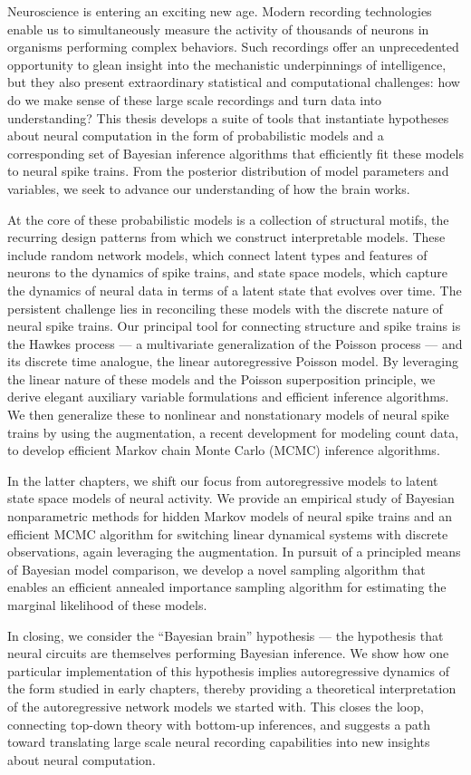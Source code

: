 Neuroscience is entering an exciting new age.  Modern recording
technologies enable us to simultaneously measure the activity of
thousands of neurons in organisms performing complex behaviors.  Such
recordings offer an unprecedented opportunity to glean insight into
the mechanistic underpinnings of intelligence, but they also present
extraordinary statistical and computational challenges: how do we make
sense of these large scale recordings and turn data into
understanding? This thesis develops a suite of tools that instantiate
hypotheses about neural computation in the form of
probabilistic models and a corresponding set of Bayesian inference
algorithms that efficiently fit these models to neural spike trains.
From the posterior distribution of model parameters and variables,
we seek to advance our understanding of how the brain works. 

At the core of these probabilistic models is a collection of
structural motifs, the recurring design patterns from which we
construct interpretable models. These include random network models,
which connect latent types and features of neurons to the dynamics of
spike trains, and state space models, which capture the dynamics of
neural data in terms of a latent state that evolves over time.  The
persistent challenge lies in reconciling these models with the
discrete nature of neural spike trains.  Our principal tool for
connecting structure and spike trains is the Hawkes process --- a
multivariate generalization of the Poisson process --- and its
discrete time analogue, the linear autoregressive Poisson model.  By
leveraging the linear nature of these models and the Poisson
superposition principle, we derive elegant auxiliary variable
formulations and efficient inference algorithms. We then generalize
these to nonlinear and nonstationary models of neural spike trains by
using the \polyagamma augmentation, a recent development for modeling
count data, to develop efficient Markov chain Monte Carlo (MCMC)
inference algorithms.

In the latter chapters, we shift our focus from autoregressive models
to latent state space models of neural activity. We provide an
empirical study of Bayesian nonparametric methods for hidden Markov
models of neural spike trains and an efficient MCMC algorithm for
switching linear dynamical systems with discrete observations, again
leveraging the \polyagamma augmentation. In pursuit of a principled
means of Bayesian model comparison, we develop a novel \polyagamma
sampling algorithm that enables an efficient annealed
importance sampling algorithm for estimating the marginal likelihood of
these models.

In closing, we consider the ``Bayesian brain'' hypothesis --- the
hypothesis that neural circuits are themselves performing Bayesian
inference.  We show how one particular implementation of this
hypothesis implies autoregressive dynamics of the form studied
in early chapters, thereby providing a theoretical interpretation of
the autoregressive network models we started with.  This closes the
loop, connecting top-down theory with bottom-up inferences, and
suggests a path toward translating large scale neural recording
capabilities into new insights about neural computation.


